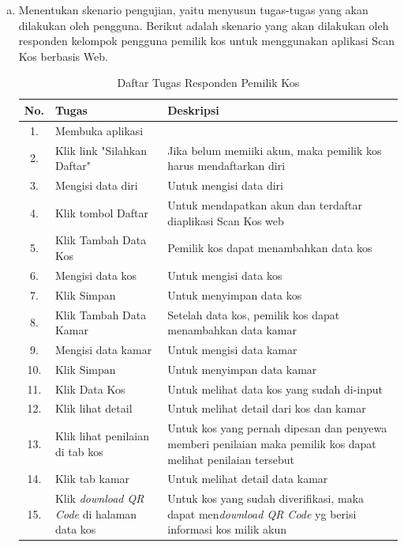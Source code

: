 	\begin{enumerate}[a.]
		\item Menentukan skenario pengujian, yaitu menyusun tugas-tugas yang akan dilakukan oleh pengguna. Berikut adalah skenario yang akan dilakukan oleh responden kelompok pengguna pemilik kos untuk menggunakan aplikasi Scan Kos berbasis Web.
		
		\begin{longtable}{ |c|p{5cm}|p{7cm}| }
			\caption{Daftar Tugas Responden Pemilik Kos}
			\label{skenarioPK} \\
			\hline
			No. & Tugas & Deskripsi \\
			\hline
			1. & Membuka aplikasi &  \\
			\hline
			2.  & Klik link "Silahkan Daftar" & Jika belum memiiki akun, maka pemilik kos harus mendaftarkan diri\\
			\hline
			3. & Mengisi data diri & Untuk mengisi data diri\\
			\hline
			4. & Klik tombol Daftar & Untuk mendapatkan akun dan terdaftar diaplikasi Scan Kos web\\
			\hline
			5. & Klik Tambah Data Kos & Pemilik kos dapat menambahkan data kos\\
			\hline
			6. & Mengisi data kos & Untuk mengisi data kos \\
			\hline
			7. & Klik Simpan & Untuk menyimpan data kos \\
			\hline
			8. & Klik Tambah Data Kamar & Setelah data kos, pemilik kos dapat menambahkan data kamar\\
			\hline
			9. & Mengisi data kamar & Untuk mengisi data kamar \\
			\hline
			10. & Klik Simpan & Untuk menyimpan data kamar \\
			\hline
			11. & Klik Data Kos & Untuk melihat data kos yang sudah di-input \\
			\hline
			12. & Klik lihat detail & Untuk melihat detail dari kos dan kamar \\
			\hline
			13. & Klik lihat penilaian di tab kos & Untuk kos yang pernah dipesan dan penyewa memberi penilaian maka pemilik kos dapat melihat penilaian tersebut \\
			\hline
			14. & Klik tab kamar & Untuk melihat detail data kamar \\
			\hline
			15. & Klik \textit{download QR Code} di halaman data kos & Untuk kos yang sudah diverifikasi, maka dapat men\textit{download QR Code} yg berisi informasi kos milik akun \\

\end{longtable}
\end{enumerate}
